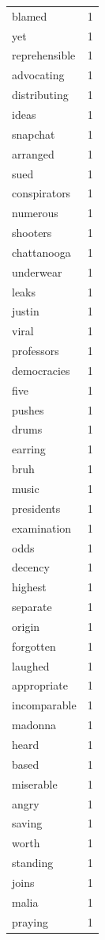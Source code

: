\begin{tabular}{lr}
blamed & 1 \\
yet & 1 \\
reprehensible & 1 \\
advocating & 1 \\
distributing & 1 \\
ideas & 1 \\
snapchat & 1 \\
arranged & 1 \\
sued & 1 \\
conspirators & 1 \\
numerous & 1 \\
shooters & 1 \\
chattanooga & 1 \\
underwear & 1 \\
leaks & 1 \\
justin & 1 \\
viral & 1 \\
professors & 1 \\
democracies & 1 \\
five & 1 \\
pushes & 1 \\
drums & 1 \\
earring & 1 \\
bruh & 1 \\
music & 1 \\
presidents & 1 \\
examination & 1 \\
odds & 1 \\
decency & 1 \\
highest & 1 \\
separate & 1 \\
origin & 1 \\
forgotten & 1 \\
laughed & 1 \\
appropriate & 1 \\
incomparable & 1 \\
madonna & 1 \\
heard & 1 \\
based & 1 \\
miserable & 1 \\
angry & 1 \\
saving & 1 \\
worth & 1 \\
standing & 1 \\
joins & 1 \\
malia & 1 \\
praying & 1 \\

\end{tabular}
